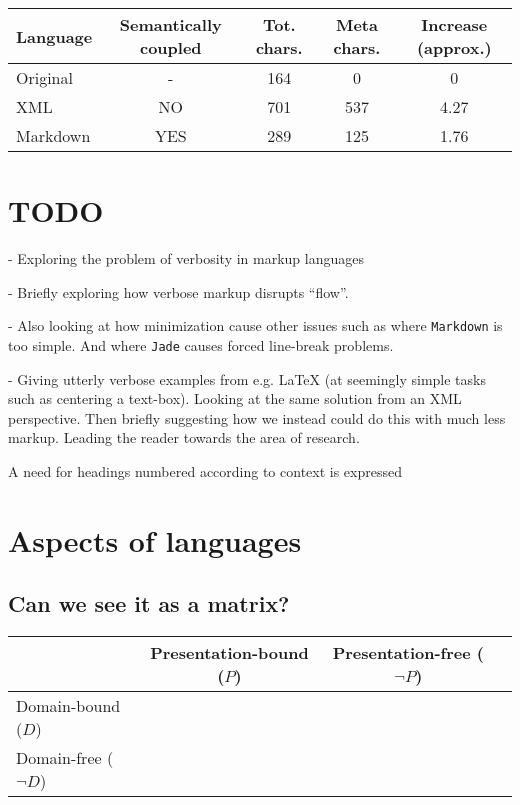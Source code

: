 \documentclass{scrreprt}
\begin{document}
\vspace{12pt}
\begin{tabular}{l c c c c}
Language
& Semantically coupled
& Tot. chars.
& Meta chars.
& Increase (approx.)
\\
\hline
Original & -   & 164 & 0   & 0\\
XML      & NO  & 701 & 537 & 4.27\\
Markdown & YES & 289 & 125 & 1.76
\end{tabular}
\vspace{12pt}






\section{TODO}
- Exploring the problem of verbosity in markup languages

- Briefly exploring how verbose markup disrupts ``flow''.

- Also looking at how minimization cause other issues such as where \texttt{Markdown} is too simple. And where \texttt{Jade} causes forced line-break problems.

- Giving utterly verbose examples from e.g. LaTeX (at seemingly simple tasks such as centering a text-box). Looking at the same solution from an XML perspective. Then briefly suggesting how we instead could do this with much less markup. Leading the reader towards the area of research.

A need for headings numbered according to context is expressed





\section{Aspects of languages}
\subsection{Can we see it as a matrix?}

\begin{tabular}{ l | c | c | c }
    & Presentation-bound (\(P\)) & Presentation-free (\(\neg P \))
    \\ \hline

    Domain-bound (\(D\)) 
    \\ \hline

    Domain-free (\(\neg D\))
\end{tabular}
\end{document}
